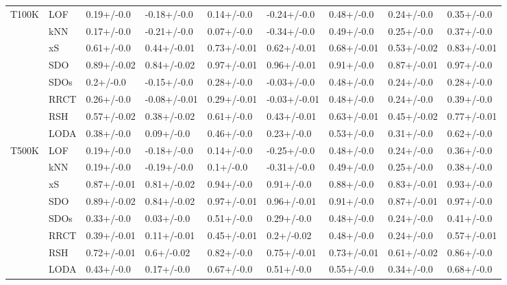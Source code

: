 \begin{table}
\begin{tabular}{lllllllll}
T100K & LOF &   0.19+/-0.0 &   -0.18+/-0.0 &   0.14+/-0.0 &   -0.24+/-0.0 &   0.48+/-0.0 &   0.24+/-0.0 &   0.35+/-0.0 \\
      & kNN &   0.17+/-0.0 &   -0.21+/-0.0 &   0.07+/-0.0 &   -0.34+/-0.0 &   0.49+/-0.0 &   0.25+/-0.0 &   0.37+/-0.0 \\
      & xS &   0.61+/-0.0 &   0.44+/-0.01 &  0.73+/-0.01 &   0.62+/-0.01 &  0.68+/-0.01 &  0.53+/-0.02 &  0.83+/-0.01 \\
      & SDO &  0.89+/-0.02 &   0.84+/-0.02 &  0.97+/-0.01 &   0.96+/-0.01 &   0.91+/-0.0 &  0.87+/-0.01 &   0.97+/-0.0 \\
      & SDOs &    0.2+/-0.0 &   -0.15+/-0.0 &   0.28+/-0.0 &   -0.03+/-0.0 &   0.48+/-0.0 &   0.24+/-0.0 &   0.28+/-0.0 \\
      & RRCT &   0.26+/-0.0 &  -0.08+/-0.01 &  0.29+/-0.01 &  -0.03+/-0.01 &   0.48+/-0.0 &   0.24+/-0.0 &   0.39+/-0.0 \\
      & RSH &  0.57+/-0.02 &   0.38+/-0.02 &   0.61+/-0.0 &   0.43+/-0.01 &  0.63+/-0.01 &  0.45+/-0.02 &  0.77+/-0.01 \\
      & LODA &   0.38+/-0.0 &    0.09+/-0.0 &   0.46+/-0.0 &    0.23+/-0.0 &   0.53+/-0.0 &   0.31+/-0.0 &   0.62+/-0.0 \\
T500K & LOF &   0.19+/-0.0 &   -0.18+/-0.0 &   0.14+/-0.0 &   -0.25+/-0.0 &   0.48+/-0.0 &   0.24+/-0.0 &   0.36+/-0.0 \\
      & kNN &   0.19+/-0.0 &   -0.19+/-0.0 &    0.1+/-0.0 &   -0.31+/-0.0 &   0.49+/-0.0 &   0.25+/-0.0 &   0.38+/-0.0 \\
      & xS &  0.87+/-0.01 &   0.81+/-0.02 &   0.94+/-0.0 &    0.91+/-0.0 &   0.88+/-0.0 &  0.83+/-0.01 &   0.93+/-0.0 \\
      & SDO &  0.89+/-0.02 &   0.84+/-0.02 &  0.97+/-0.01 &   0.96+/-0.01 &   0.91+/-0.0 &  0.87+/-0.01 &   0.97+/-0.0 \\
      & SDOs &   0.33+/-0.0 &    0.03+/-0.0 &   0.51+/-0.0 &    0.29+/-0.0 &   0.48+/-0.0 &   0.24+/-0.0 &   0.41+/-0.0 \\
      & RRCT &  0.39+/-0.01 &   0.11+/-0.01 &  0.45+/-0.01 &    0.2+/-0.02 &   0.48+/-0.0 &   0.24+/-0.0 &  0.57+/-0.01 \\
      & RSH &  0.72+/-0.01 &    0.6+/-0.02 &   0.82+/-0.0 &   0.75+/-0.01 &  0.73+/-0.01 &  0.61+/-0.02 &   0.86+/-0.0 \\
      & LODA &   0.43+/-0.0 &    0.17+/-0.0 &   0.67+/-0.0 &    0.51+/-0.0 &   0.55+/-0.0 &   0.34+/-0.0 &   0.68+/-0.0 \\
\bottomrule
\end{tabular}
\end{table}
